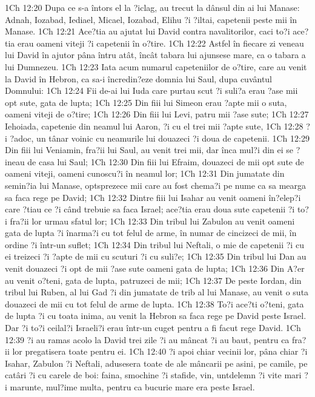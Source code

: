 1Ch 12:20  Dupa ce s-a întors el la ?iclag, au trecut la dânsul din ai lui Manase: Adnah, Iozabad, Iediael, Micael, Iozabad, Elihu ?i ?iltai, capetenii peste mii în Manase.
1Ch 12:21  Ace?tia au ajutat lui David contra navalitorilor, caci to?i ace?tia erau oameni viteji ?i capetenii în o?tire.
1Ch 12:22  Astfel în fiecare zi veneau lui David în ajutor pâna întru atât, încât tabara lui ajunsese mare, ca o tabara a lui Dumnezeu.
1Ch 12:23  Iata acum numarul capeteniilor de o?tire, care au venit la David în Hebron, ca sa-i încredin?eze domnia lui Saul, dupa cuvântul Domnului:
1Ch 12:24  Fii de-ai lui Iuda care purtau scut ?i suli?a erau ?ase mii opt sute, gata de lupta;
1Ch 12:25  Din fiii lui Simeon erau ?apte mii o suta, oameni viteji de o?tire;
1Ch 12:26  Din fiii lui Levi, patru mii ?ase sute;
1Ch 12:27  Iehoiada, capetenie din neamul lui Aaron, ?i cu el trei mii ?apte sute,
1Ch 12:28  ?i ?adoc, un tânar voinic cu neamurile lui douazeci ?i doua de capetenii.
1Ch 12:29  Din fiii lui Veniamin, fra?ii lui Saul, au venit trei mii, dar înca mul?i din ei se ?ineau de casa lui Saul;
1Ch 12:30  Din fiii lui Efraim, douazeci de mii opt sute de oameni viteji, oameni cunoscu?i în neamul lor;
1Ch 12:31  Din jumatate din semin?ia lui Manase, optsprezece mii care au fost chema?i pe nume ca sa mearga sa faca rege pe David;
1Ch 12:32  Dintre fiii lui Isahar au venit oameni în?elep?i care ?tiau ce ?i când trebuie sa faca Israel; ace?tia erau doua sute capetenii ?i to?i fra?ii lor urmau sfatul lor;
1Ch 12:33  Din tribul lui Zabulon au venit oameni gata de lupta ?i înarma?i cu tot felul de arme, în numar de cincizeci de mii, în ordine ?i într-un suflet;
1Ch 12:34  Din tribul lui Neftali, o mie de capetenii ?i cu ei treizeci ?i ?apte de mii cu scuturi ?i cu suli?e;
1Ch 12:35  Din tribul lui Dan au venit douazeci ?i opt de mii ?ase sute oameni gata de lupta;
1Ch 12:36  Din A?er au venit o?teni, gata de lupta, patruzeci de mii;
1Ch 12:37  De peste Iordan, din tribul lui Ruben, al lui Gad ?i din jumatate de trib al lui Manase, au venit o suta douazeci de mii cu tot felul de arme de lupta.
1Ch 12:38  To?i ace?ti o?teni, gata de lupta ?i cu toata inima, au venit la Hebron sa faca rege pe David peste Israel. Dar ?i to?i ceilal?i Israeli?i erau într-un cuget pentru a fi facut rege David.
1Ch 12:39  ?i au ramas acolo la David trei zile ?i au mâncat ?i au baut, pentru ca fra?ii lor pregatisera toate pentru ei.
1Ch 12:40  ?i apoi chiar vecinii lor, pâna chiar ?i Isahar, Zabulon ?i Neftali, adusesera toate de ale mâncarii pe asini, pe camile, pe catâri ?i cu carele de boi: faina, smochine ?i stafide, vin, untdelemn ?i vite mari ?i marunte, mul?ime multa, pentru ca bucurie mare era peste Israel.
